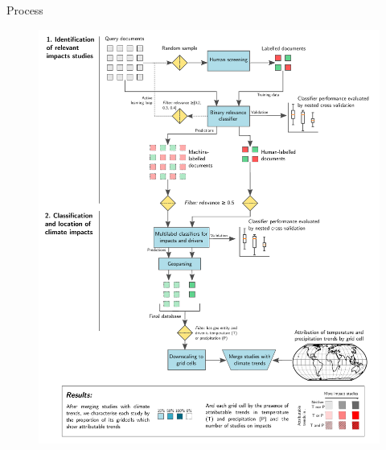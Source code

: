 \documentclass[9pt]{beamer}
\begin{document}
\begin{frame}{Process}
\begin{figure}
	\includegraphics[width=0.65\linewidth]{../figures/process.pdf}
\end{figure}
\end{frame}
\end{document}
